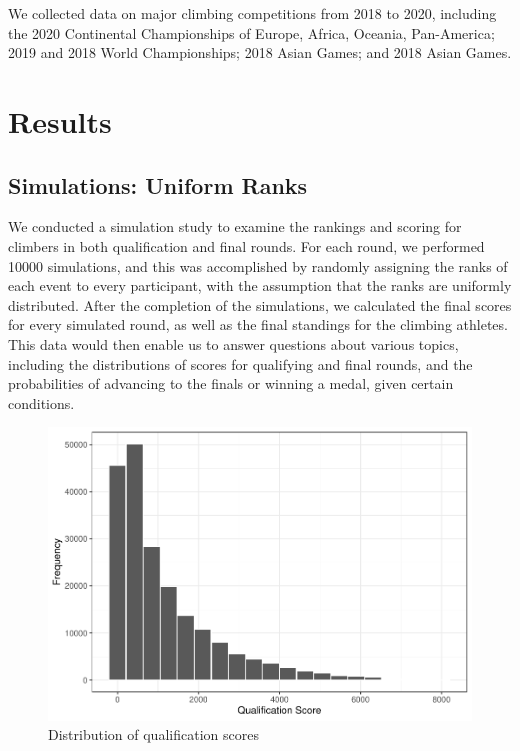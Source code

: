 \documentclass[12pt]{article}
\begin{document}
We collected data on major climbing competitions from 2018 to 2020,
including the 2020 Continental Championships of Europe, Africa, Oceania,
Pan-America; 2019 and 2018 World Championships; 2018 Asian Games; and
2018 Asian Games.

\hypertarget{results}{%
\section{Results}\label{results}}

\hypertarget{simulations-uniform-ranks}{%
\subsection{Simulations: Uniform
Ranks}\label{simulations-uniform-ranks}}

We conducted a simulation study to examine the rankings and scoring for
climbers in both qualification and final rounds. For each round, we
performed 10000 simulations, and this was accomplished by randomly
assigning the ranks of each event to every participant, with the
assumption that the ranks are uniformly distributed. After the
completion of the simulations, we calculated the final scores for every
simulated round, as well as the final standings for the climbing
athletes. This data would then enable us to answer questions about
various topics, including the distributions of scores for qualifying and
final rounds, and the probabilities of advancing to the finals or
winning a medal, given certain conditions.

\begin{figure}
\centering
\includegraphics{draft_files/figure-latex/unnamed-chunk-4-1.pdf}
\caption{Distribution of qualification scores}
\end{figure}
\end{document}
